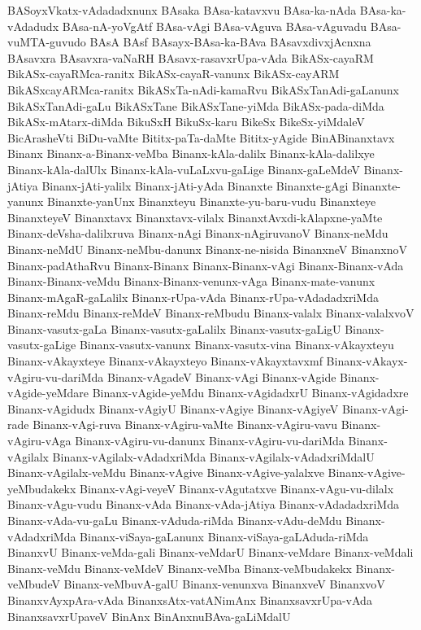 {BASoyxVkatx-vAdadadxnunx
BAsaka
BAsa-katavxvu
BAsa-ka-nAda
BAsa-ka-vAdadudx
BAsa-nA-yoVgAtf
BAsa-vAgi
BAsa-vAguva
BAsa-vAguvadu
BAsa-vuMTA-guvudo
BAsA
BAsf
BAsayx-BAsa-ka-BAva
BAsavxdivxjAcnxna
BAsavxra
BAsavxra-vaNaRH
BAsavx-rasavxrUpa-vAda
BikASx-cayaRM
BikASx-cayaRMca-ranitx
BikASx-cayaR-vanunx
BikASx-cayARM
BikASxcayARMca-ranitx
BikASxTa-nAdi-kamaRvu
BikASxTanAdi-gaLanunx
BikASxTanAdi-gaLu
BikASxTane
BikASxTane-yiMda
BikASx-pada-diMda
BikASx-mAtarx-diMda
BikuSxH
BikuSx-karu
BikeSx
BikeSx-yiMdaleV
BicArasheVti
BiDu-vaMte
Bititx-paTa-daMte
Bititx-yAgide
BinABinanxtavx
Binanx
Binanx-a-Binanx-veMba
Binanx-kAla-dalilx
Binanx-kAla-dalilxye
Binanx-kAla-dalUlx
Binanx-kAla-vuLaLxvu-gaLige
Binanx-gaLeMdeV
Binanx-jAtiya
Binanx-jAti-yalilx
Binanx-jAti-yAda
Binanxte
Binanxte-gAgi
Binanxte-yanunx
Binanxte-yanUnx
Binanxteyu
Binanxte-yu-baru-vudu
Binanxteye
BinanxteyeV
Binanxtavx
Binanxtavx-vilalx
BinanxtAvxdi-kAlapxne-yaMte
Binanx-deVsha-dalilxruva
Binanx-nAgi
Binanx-nAgiruvanoV
Binanx-neMdu
Binanx-neMdU
Binanx-neMbu-danunx
Binanx-ne-nisida
BinanxneV
BinanxnoV
Binanx-padAthaRvu
Binanx-Binanx
Binanx-Binanx-vAgi
Binanx-Binanx-vAda
Binanx-Binanx-veMdu
Binanx-Binanx-venunx-vAga
Binanx-mate-vanunx
Binanx-mAgaR-gaLalilx
Binanx-rUpa-vAda
Binanx-rUpa-vAdadadxriMda
Binanx-reMdu
Binanx-reMdeV
Binanx-reMbudu
Binanx-valalx
Binanx-valalxvoV
Binanx-vasutx-gaLa
Binanx-vasutx-gaLalilx
Binanx-vasutx-gaLigU
Binanx-vasutx-gaLige
Binanx-vasutx-vanunx
Binanx-vasutx-vina
Binanx-vAkayxteyu
Binanx-vAkayxteye
Binanx-vAkayxteyo
Binanx-vAkayxtavxmf
Binanx-vAkayx-vAgiru-vu-dariMda
Binanx-vAgadeV
Binanx-vAgi
Binanx-vAgide
Binanx-vAgide-yeMdare
Binanx-vAgide-yeMdu
Binanx-vAgidadxrU
Binanx-vAgidadxre
Binanx-vAgidudx
Binanx-vAgiyU
Binanx-vAgiye
Binanx-vAgiyeV
Binanx-vAgi-rade
Binanx-vAgi-ruva
Binanx-vAgiru-vaMte
Binanx-vAgiru-vavu
Binanx-vAgiru-vAga
Binanx-vAgiru-vu-danunx
Binanx-vAgiru-vu-dariMda
Binanx-vAgilalx
Binanx-vAgilalx-vAdadxriMda
Binanx-vAgilalx-vAdadxriMdalU
Binanx-vAgilalx-veMdu
Binanx-vAgive
Binanx-vAgive-yalalxve
Binanx-vAgive-yeMbudakekx
Binanx-vAgi-veyeV
Binanx-vAgutatxve
Binanx-vAgu-vu-dilalx
Binanx-vAgu-vudu
Binanx-vAda
Binanx-vAda-jAtiya
Binanx-vAdadadxriMda
Binanx-vAda-vu-gaLu
Binanx-vAduda-riMda
Binanx-vAdu-deMdu
Binanx-vAdadxriMda
Binanx-viSaya-gaLanunx
Binanx-viSaya-gaLAduda-riMda
BinanxvU
Binanx-veMda-gali
Binanx-veMdarU
Binanx-veMdare
Binanx-veMdali
Binanx-veMdu
Binanx-veMdeV
Binanx-veMba
Binanx-veMbudakekx
Binanx-veMbudeV
Binanx-veMbuvA-galU
Binanx-venunxva
BinanxveV
BinanxvoV
BinanxvAyxpAra-vAda
BinanxsAtx-vatANimAnx
BinanxsavxrUpa-vAda
BinanxsavxrUpaveV
BinAnx
BinAnxnuBAva-gaLiMdalU
}
